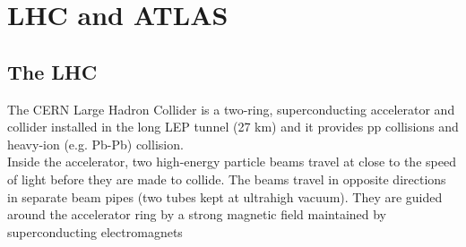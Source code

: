 \documentclass[a4paper, oneside]{book}
\begin{document}
\tableofcontents

	\chapter{LHC and ATLAS}
		\section{The LHC}
		The CERN Large Hadron Collider is a two-ring, superconducting accelerator and collider installed in the long LEP tunnel (27 km)\cite{LHC design} and it provides pp collisions and heavy-ion (e.g. Pb-Pb) collision.\\
		Inside the accelerator, two high-energy particle beams travel at close to the speed of light before they are made to collide. The beams travel in opposite directions in separate beam pipes (two tubes kept at ultrahigh vacuum). They are guided around the accelerator ring by a strong magnetic field maintained by superconducting electromagnets\cite{LHC introduction}
\end{document}
